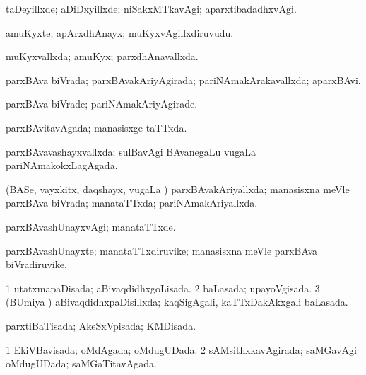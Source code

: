 {{\bentry
{} 
\gl{\kirxvi}
\expl{}
\bmng
taDeyillxde; aDiDxyillxde; niSakxMTkavAgi; aparxtibadadhxvAgi. 
\emng
\eentry

\bentry
{} 
\gl{\nA}
\expl{}
\bmng
amuKyxte; apArxdhAnayx; muKyxvAgillxdiruvudu. 
\emng
\eentry

\bentry
{} 
\gl{\gu}
\expl{}
\bmng
muKyxvallxda; amuKyx; parxdhAnavallxda. 
\emng
\eentry

\bentry
{} 
\gl{\gu}
\expl{}
\bmng
parxBAva biVrada; parxBAvakAriyAgirada; pariNAmakArakavallxda; aparxBAvi. 
\emng
\eentry

\bentry
{} 
\gl{\kirxvi}
\expl{}
\bmng
parxBAva biVrade; pariNAmakAriyAgirade. 
\emng
\eentry

\bentry
{} 
\gl{\gu}
\expl{}
\bmng
parxBAvitavAgada; manasisxge taTTxda. 
\emng
\eentry

\bentry
{} 
\gl{\gu}
\expl{}
\bmng
parxBAvavashayxvallxda; sulBavAgi BAvanegaLu \mo vugaLa pariNAmakokxLagAgada. 
\emng
\eentry

\bentry
{} 
\gl{\gu}
\expl{}
\bmng
(BASe, vayxkitx, daqshayx, \mo vugaLa \vi) parxBAvakAriyallxda; manasisxna meVle parxBAva biVrada; manataTTxda; pariNAmakAriyallxda. 
\emng
\eentry

\bentry
{} 
\gl{\kirxvi}
\expl{}
\bmng
parxBAvashUnayxvAgi; manataTTxde. 
\emng
\eentry

\bentry
{} 
\gl{\nA}
\expl{}
\bmng
parxBAvashUnayxte; manataTTxdiruvike; manasisxna meVle parxBAva biVradiruvike. 
\emng
\eentry

\bentry
{} 
\gl{\gu}
\expl{}
\bmng
\bnum
\num{1} utatxmapaDisada; aBivaqdidhxgoLisada. 
\num{2} baLasada; upayoVgisada. 
\num{3} (BUmiya \vi) aBivaqdidhxpaDisillxda; kaqSigAgali, kaTTxDakAkxgali baLasada. 
\enum
\emng
\eentry

\bentry
{} 
\gl{\gu}
\expl{}
\bmng
parxtiBaTisada; AkeSxVpisada; KMDisada. 
\emng
\eentry

\bentry
{} 
\gl{\gu}
\expl{}
\bmng
\bnum
\num{1} EkiVBavisada; oMdAgada; oMdugUDada. 
\num{2} sAMsithxkavAgirada; saMGavAgi oMdugUDada; saMGaTitavAgada. 
\enum
\emng
\eentry

}}
